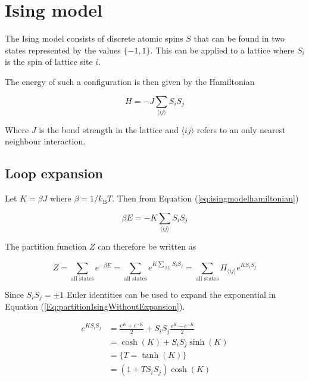 \section{Ising model}

The Ising model consists of discrete atomic spins $S$ that can be found in two states represented by the values $\{-1, 1\}$. This can be applied to a lattice where $S_i$ is the spin of lattice site $i$.

The energy of such a configuration is then given by the Hamiltonian

\begin{equation}
    H = - J \sum_{\langle ij \rangle} S_i S_j
\label{eq:isingmodelhamiltonian}
\end{equation}

Where $J$ is the bond strength in the lattice and $\langle ij \rangle$ refers to an only nearest neighbour interaction.

\subsection{Loop expansion}
\label{subsec:IsingLoopExpansion}

Let $K = \beta J$ where $\beta = 1/k_{\text{B}} T$. Then from Equation (\ref{eq:isingmodelhamiltonian})

\begin{equation}
    \beta E = - K \sum_{\langle ij \rangle} S_i S_j
\end{equation}

The partition function $Z$ can therefore be written as

\begin{equation}
    Z = \sum_{\text{all states}} e^{-\beta E} = \sum_{\text{all states}} e^{K \sum_{\langle ij \rangle} S_i S_j} = \sum_{\text{all states}} \Pi_{\langle ij \rangle} e^{K S_i S_j}
\label{Eq:partitionIsingWithoutExpansion}
\end{equation}

Since $S_i S_j = \pm 1$ Euler identities can be used to expand the exponential in Equation (\ref{Eq:partitionIsingWithoutExpansion}).

\begin{align*}
    e^{KS_i S_j} &= \frac{e^K + e^{-K}}{2} + S_i S_j \frac{e^K - e^{-K}}{2} \\
    &= \cosh (K) + S_i S_j \sinh(K) \\
    &= \{ T = \tanh(K) \} \\
    &= (1 + T S_i S_j) \cosh(K)
\end{align*}

